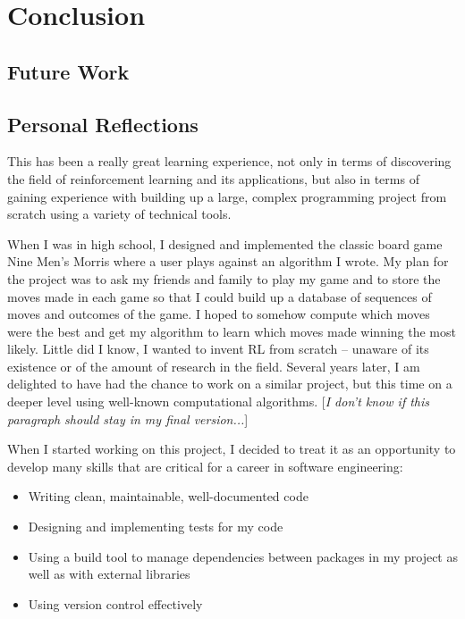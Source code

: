 \documentclass[11pt,a4paper]{report}
\begin{document}
\chapter{Conclusion}


\section{Future Work}


\section{Personal Reflections}

This has been a really great learning experience, not only in terms of discovering the field of reinforcement learning and its applications, but also in terms of gaining experience with building up a large, complex programming project from scratch using a variety of technical tools.

When I was in high school, I designed and implemented the classic board game Nine Men’s Morris where a user plays against an algorithm I wrote. My plan for the project was to ask my friends and family to play my game and to store the moves made in each game so that I could build up a database of sequences of moves and outcomes of the game. I hoped to somehow compute which moves were the best and get my algorithm to learn which moves made winning the most likely. Little did I know, I wanted to invent RL from scratch – unaware of its existence or of the amount of research in the field. Several years later, I am delighted to have had the chance to work on a similar project, but this time on a deeper level using well-known computational algorithms. [\emph{I don't know if this paragraph should stay in my final version...}]

When I started working on this project, I decided to treat it as an opportunity to develop many skills that are critical for a career in software engineering:

\begin{itemize}
	\item Writing clean, maintainable, well-documented code
	\item Designing and implementing tests for my code
	\item Using a build tool to manage dependencies between packages in my project as well as with external libraries
	\item Using version control effectively
\end{itemize}
\end{document}

